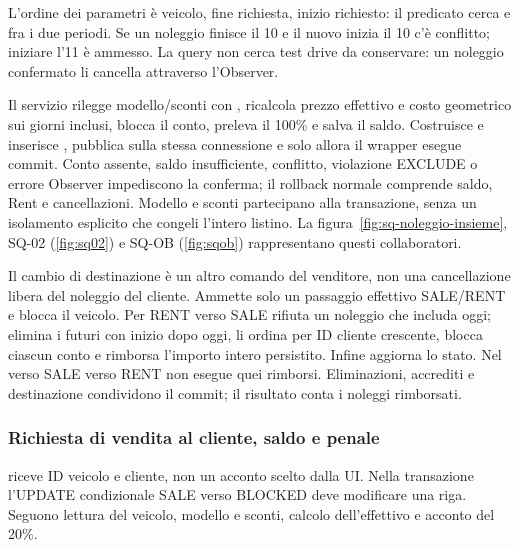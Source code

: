 L'ordine dei parametri è veicolo, fine richiesta, inizio richiesto: il
predicato cerca  e  fra i due
periodi. Se un noleggio finisce il 10 e il nuovo inizia il 10 c'è conflitto;
iniziare l'11 è ammesso. La query non cerca test drive da conservare:
un noleggio confermato li cancella attraverso l'Observer.

Il servizio rilegge modello/sconti con , ricalcola prezzo
effettivo e costo geometrico sui giorni inclusi, blocca il conto,
preleva il 100\% e salva il saldo. Costruisce e inserisce ,
pubblica  sulla stessa connessione e solo
allora il wrapper esegue commit. Conto assente, saldo insufficiente,
conflitto, violazione EXCLUDE o errore Observer impediscono la conferma;
il rollback normale comprende saldo, Rent e cancellazioni. Modello e
sconti partecipano alla transazione, senza un isolamento esplicito che
congeli l'intero listino. La figura~\ref{fig:sq-noleggio-insieme}, SQ-02
(\ref{fig:sq02}) e SQ-OB (\ref{fig:sqob}) rappresentano questi collaboratori.

Il cambio di destinazione  è un altro
comando del venditore, non una cancellazione libera del noleggio del
cliente. Ammette solo un passaggio effettivo SALE/RENT e blocca il veicolo.
Per RENT verso SALE rifiuta un noleggio che includa oggi; elimina i futuri
con inizio dopo oggi, li ordina per ID cliente crescente, blocca ciascun
conto e rimborsa l'importo intero persistito. Infine aggiorna lo stato.
Nel verso SALE verso RENT non esegue quei rimborsi. Eliminazioni, accrediti
e destinazione condividono il commit; il risultato conta i noleggi rimborsati.

\subsubsection{Richiesta di vendita al cliente, saldo e penale}
 riceve ID veicolo e cliente,
non un acconto scelto dalla UI. Nella transazione l'UPDATE condizionale
SALE verso BLOCKED deve modificare una riga. Seguono lettura del veicolo,
modello e sconti, calcolo dell'effettivo e acconto del 20\%.

